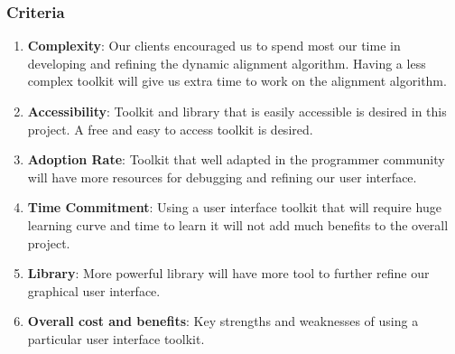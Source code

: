 \subsubsection{Criteria}
\begin{enumerate}
	\item \textbf{Complexity}: Our clients encouraged us to spend most our time in developing and refining the dynamic alignment algorithm. Having a less complex toolkit will give us extra time to work on the alignment algorithm. 
	\item \textbf{Accessibility}: Toolkit and library that is easily accessible is desired in this project. A free and easy to access toolkit is desired. 
	\item \textbf{Adoption Rate}: Toolkit that well adapted in the programmer community will have more resources for debugging and refining our user interface. 
	\item \textbf{Time Commitment}: Using a user interface toolkit that will require huge learning curve and time to learn it will not add much benefits to the overall project. 
	\item \textbf{Library}: More powerful library will have more tool to further refine our graphical user interface. 
	\item \textbf{Overall cost and benefits}: Key strengths and weaknesses of using a particular user interface toolkit.\\
\end{enumerate}

\newpage
